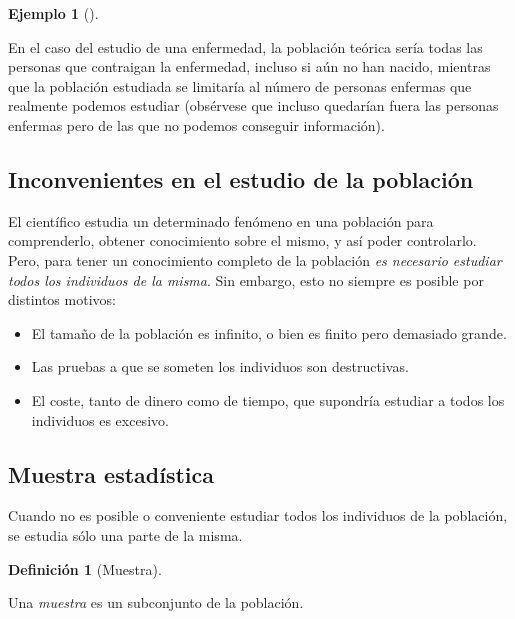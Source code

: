 \documentclass[
  spanish,
  a4paper,
]{scrreport}
\providecommand{\tightlist}{%
  \setlength{\itemsep}{0pt}\setlength{\parskip}{0pt}}
\theoremstyle{plain}
\theoremstyle{definition}
\newtheorem{example}{Ejemplo}[chapter]
\theoremstyle{definition}
\newtheorem{definition}{Definición}[chapter]
\theoremstyle{remark}
\begin{document}
\begin{example}[]\protect\hypertarget{exm-poblacion-teorica-observada}{}\label{exm-poblacion-teorica-observada}

En el caso del estudio de una enfermedad, la población teórica sería
todas las personas que contraigan la enfermedad, incluso si aún no han
nacido, mientras que la población estudiada se limitaría al número de
personas enfermas que realmente podemos estudiar (obsérvese que incluso
quedarían fuera las personas enfermas pero de las que no podemos
conseguir información).

\end{example}

\subsection{Inconvenientes en el estudio de la
población}\label{inconvenientes-en-el-estudio-de-la-poblaciuxf3n}

El científico estudia un determinado fenómeno en una población para
comprenderlo, obtener conocimiento sobre el mismo, y así poder
controlarlo. Pero, para tener un conocimiento completo de la población
\emph{es necesario estudiar todos los individuos de la misma}. Sin
embargo, esto no siempre es posible por distintos motivos:

\begin{itemize}
\tightlist
\item
  El tamaño de la población es infinito, o bien es finito pero demasiado
  grande.
\item
  Las pruebas a que se someten los individuos son destructivas.
\item
  El coste, tanto de dinero como de tiempo, que supondría estudiar a
  todos los individuos es excesivo.
\end{itemize}

\subsection{Muestra estadística}\label{muestra-estaduxedstica}

Cuando no es posible o conveniente estudiar todos los individuos de la
población, se estudia sólo una parte de la misma.

\begin{definition}[Muestra]\protect\hypertarget{def-muestra}{}\label{def-muestra}

Una \emph{muestra} es un subconjunto de la población.

\end{definition}
\end{document}
